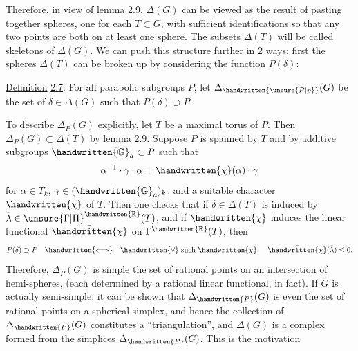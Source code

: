 
Therefore, in view of lemma 2.9, $\Delta(G)$ can be viewed as the result of pasting together spheres, one for each $T\subset G$, with sufficient identifications so that any two points are both on at least one sphere. The subsets $\Delta(T)$ will be called \uline{skeletons} of $\Delta(G)$. We can push this structure further in 2 ways: first the spheres $\Delta(T)$ can be broken up by considering the function $P(\delta)$:

\uline{Definition} \uline{2.7}: For all parabolic subgroups $P$, let $\Delta_{\handwritten{\unsure{P|p}}}(G)$ be the set of $\delta\in\Delta(G)$ such that $P(\delta)\supset P$.

To describe $\Delta_P(G)$ explicitly, let $T$ be a maximal torus of $P$. Then $\Delta_P(G)\subset\Delta(T)$ by lemma 2.9. Suppose $P$ is spanned by $T$ and by additive subgroups $\handwritten{\mathbb{G}}_a\subset P$ such that
\[
 \alpha^{-1}\cdot\gamma\cdot\alpha=\handwritten{\chi}(\alpha)\cdot\gamma
\]
for $\alpha\in T_k$, $\gamma\in(\handwritten{\mathbb{G}}_a)_k$, and a suitable character $\handwritten{\chi}$ of $T$. Then one checks that if $\delta\in\Delta(T)$ is induced by $\bar{\lambda}\in\unsure{\Gamma|\Pi}^{\handwritten{\mathbb{R}}}(T)$, and if $\handwritten{\chi}$ induces the linear functional $\bar{\handwritten{\chi}}$ on $\Gamma^{\handwritten{\mathbb{R}}}(T)$, then
\[
 P(\delta)\supset P\quad\handwritten{\Longleftrightarrow}\quad\handwritten{\forall}\text{ such }\handwritten{\chi},\quad\bar{\handwritten{\chi}}(\bar{\lambda})\leq 0.
\]
Therefore, $\Delta_P(G)$ is simple the set of rational points on an intersection of hemi-spheres, (each determined by a rational linear functional, in fact). If $G$ is actually semi-simple, it can be shown that $\Delta_{\handwritten{P}}(G)$ is even the set of rational points on a spherical simplex, and hence the collection of $\Delta_{\handwritten{P}}(G)$ constitutes a ``triangulation'', and $\Delta(G)$ is a complex formed from the simplices $\Delta_{\handwritten{P}}(G)$. This is the motivation
